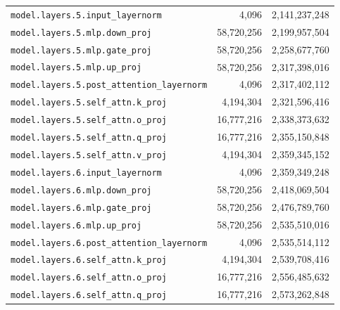 \documentclass[10pt,a4paper]{article}
\theoremstyle{definition}
\begin{document}
\begin{appendices}
\begin{longtable}{p{9.5cm}rr}
\texttt{model.\allowbreak{}layers.\allowbreak{}5.\allowbreak{}input\_layernorm} & 4,096 & 2,141,237,248 \\
\texttt{model.\allowbreak{}layers.\allowbreak{}5.\allowbreak{}mlp.\allowbreak{}down\_proj} & 58,720,256 & 2,199,957,504 \\
\texttt{model.\allowbreak{}layers.\allowbreak{}5.\allowbreak{}mlp.\allowbreak{}gate\_proj} & 58,720,256 & 2,258,677,760 \\
\texttt{model.\allowbreak{}layers.\allowbreak{}5.\allowbreak{}mlp.\allowbreak{}up\_proj} & 58,720,256 & 2,317,398,016 \\
\texttt{model.\allowbreak{}layers.\allowbreak{}5.\allowbreak{}post\_attention\_layernorm} & 4,096 & 2,317,402,112 \\
\texttt{model.\allowbreak{}layers.\allowbreak{}5.\allowbreak{}self\_attn.\allowbreak{}k\_proj} & 4,194,304 & 2,321,596,416 \\
\texttt{model.\allowbreak{}layers.\allowbreak{}5.\allowbreak{}self\_attn.\allowbreak{}o\_proj} & 16,777,216 & 2,338,373,632 \\
\texttt{model.\allowbreak{}layers.\allowbreak{}5.\allowbreak{}self\_attn.\allowbreak{}q\_proj} & 16,777,216 & 2,355,150,848 \\
\texttt{model.\allowbreak{}layers.\allowbreak{}5.\allowbreak{}self\_attn.\allowbreak{}v\_proj} & 4,194,304 & 2,359,345,152 \\
\texttt{model.\allowbreak{}layers.\allowbreak{}6.\allowbreak{}input\_layernorm} & 4,096 & 2,359,349,248 \\
\texttt{model.\allowbreak{}layers.\allowbreak{}6.\allowbreak{}mlp.\allowbreak{}down\_proj} & 58,720,256 & 2,418,069,504 \\
\texttt{model.\allowbreak{}layers.\allowbreak{}6.\allowbreak{}mlp.\allowbreak{}gate\_proj} & 58,720,256 & 2,476,789,760 \\
\texttt{model.\allowbreak{}layers.\allowbreak{}6.\allowbreak{}mlp.\allowbreak{}up\_proj} & 58,720,256 & 2,535,510,016 \\
\texttt{model.\allowbreak{}layers.\allowbreak{}6.\allowbreak{}post\_attention\_layernorm} & 4,096 & 2,535,514,112 \\
\texttt{model.\allowbreak{}layers.\allowbreak{}6.\allowbreak{}self\_attn.\allowbreak{}k\_proj} & 4,194,304 & 2,539,708,416 \\
\texttt{model.\allowbreak{}layers.\allowbreak{}6.\allowbreak{}self\_attn.\allowbreak{}o\_proj} & 16,777,216 & 2,556,485,632 \\
\texttt{model.\allowbreak{}layers.\allowbreak{}6.\allowbreak{}self\_attn.\allowbreak{}q\_proj} & 16,777,216 & 2,573,262,848 \\

\end{longtable}
\end{appendices}
\end{document}
